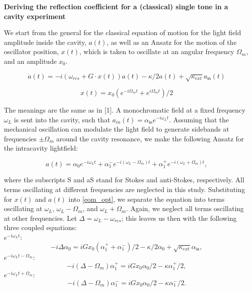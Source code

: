 \documentclass{article}
\begin{document}
\textbf{\Large
Deriving the reflection coefficient for a (classical) single tone in a cavity experiment
}
\vspace{2mm}

{
We start from the general for the classical equation of motion for the light field amplitude inside the cavity,  $a(t)$, as well as an Ansatz for the motion of the oscillator position, $x(t)$, which is taken to oscillate at an angular frequency $\Omega_m$, and an amplitude $x_{0}$.


\begin{equation}
\dot{a}(t) = -i(\omega_{res} + G\cdot x(t)) a(t) -\kappa/2 a(t) + \sqrt{\kappa_{ext}} a_{\mathsf{in}}(t)
\label{eom_opt}
\end{equation}

\begin{equation}
x(t) = x_{0} (e^{-i\Omega_mt} + e^{i\Omega_mt})/2
\label{eom_mech}
\end{equation}

The meanings are the same as in [1]. A monochromatic field at a fixed frequency $\omega_L$ is sent into the cavity, such that $a_{in}(t)= \alpha_{\mathsf{in}}e^{-i\omega_Lt}$. Assuming that the mechanical oscillation can modulate the light field to generate sidebands at frequencies $\pm\Omega_m$ around the cavity resonance, we make the following Ansatz for the intracavity lightfield:

\begin{equation}
a(t) = \alpha_0 e^{-i\omega_Lt} + \alpha_1^- e^{-i(\omega_L - \Omega_m)t} + \alpha_1^+ e^{-i(\omega_L + \Omega_m)t},
\label{ansatz_a}
\end{equation}

where the subscripts S and aS stand for Stokes and anti-Stokes, respectively. All terms oscillating at different frequencies are neglected in this study. Substituting for $x(t)$ and $a(t)$ into \eqref{eom_opt}, we separate the equation into terms oscillating at $\omega_L$, $\omega_L-\Omega_m$, and $\omega_L+\Omega_m$. Again, we neglect all terms oscillating at other frequencies. Let $\Delta=\omega_L-\omega_{res}$; this leaves us then with the following three coupled equations:\\
$e^{-i\omega_Lt}$:
\begin{equation}
-i\Delta \alpha_0 = i G x_0(\alpha_1^+ + \alpha_1^-)/2 - \kappa/2 \alpha_0 + \sqrt{\kappa_{ext}} \alpha_{\mathsf{in}},
\label{eom_a0}
\end{equation}
$e^{-i\omega_Lt - \Omega_m}$:
\begin{equation}
-i(\Delta - \Omega_m)\alpha_1^+ = i G x_0 \alpha_0/2 - \kappa \alpha_1^+/2,
\end{equation}
$e^{-i\omega_Lt + \Omega_m}$:
\label{eom_a1+}
\begin{equation}
-i(\Delta-\Omega_m) \alpha_1^- = i G x_0 \alpha_0/2 - \kappa \alpha_1^-/2.
\label{eom_a1-}
\end{equation}

}
\end{document}
